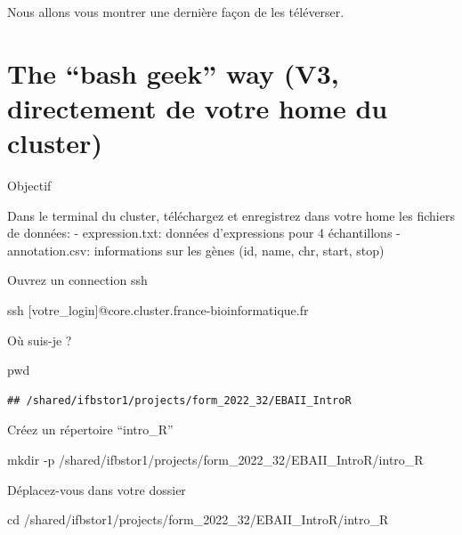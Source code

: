 \documentclass[
]{book}
\newenvironment{Shaded}{\begin{snugshade}}{\end{snugshade}}
\newcommand{\AttributeTok}[1]{\textcolor[rgb]{0.77,0.63,0.00}{#1}}
\newcommand{\BuiltInTok}[1]{#1}
\newcommand{\FunctionTok}[1]{\textcolor[rgb]{0.00,0.00,0.00}{#1}}
\newcommand{\NormalTok}[1]{#1}
\begin{document}
Nous allons vous montrer une dernière façon de les téléverser.

\hypertarget{the-bash-geek-way-v3-directement-de-votre-home-du-cluster}{%
\section{The ``bash geek'' way (V3, directement de votre home du cluster)}\label{the-bash-geek-way-v3-directement-de-votre-home-du-cluster}}

Objectif

Dans le terminal du cluster, téléchargez et enregistrez dans votre home les fichiers de données:
- expression.txt: données d'expressions pour 4 échantillons
- annotation.csv: informations sur les gènes (id, name, chr, start, stop)

Ouvrez un connection ssh

\begin{Shaded}
\begin{Highlighting}[]
\FunctionTok{ssh}\NormalTok{ [votre\_login]@core.cluster.france{-}bioinformatique.fr}
\end{Highlighting}
\end{Shaded}

Où suis-je ?

\begin{Shaded}
\begin{Highlighting}[]
\BuiltInTok{pwd}
\end{Highlighting}
\end{Shaded}

\begin{verbatim}
## /shared/ifbstor1/projects/form_2022_32/EBAII_IntroR
\end{verbatim}

Créez un répertoire ``intro\_R''

\begin{Shaded}
\begin{Highlighting}[]
\FunctionTok{mkdir} \AttributeTok{{-}p}\NormalTok{ /shared/ifbstor1/projects/form\_2022\_32/EBAII\_IntroR/intro\_R}
\end{Highlighting}
\end{Shaded}

Déplacez-vous dans votre dossier

\begin{Shaded}
\begin{Highlighting}[]
\BuiltInTok{cd}\NormalTok{ /shared/ifbstor1/projects/form\_2022\_32/EBAII\_IntroR/intro\_R}
\end{Highlighting}
\end{Shaded}
\end{document}
